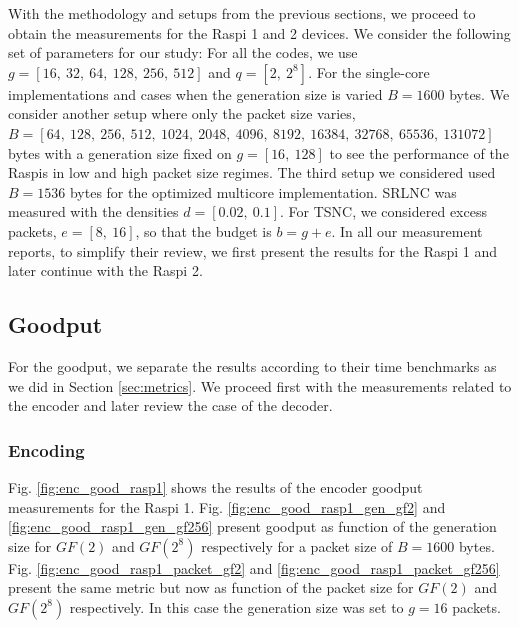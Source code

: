 \label{sec:measurements}

With the methodology and setups from the previous sections, we
proceed to obtain the measurements for the \ac{Raspi} 1 and 2 devices.
We consider the following set of parameters for our study:
For all the codes, we use $g = [16,\ 32,\ 64,\ 128,\ 256,\ 512]$
and $q = [2,\ 2^8]$. For the single-core implementations
and cases when the generation size is varied $B = 1600$ bytes.
We consider another setup where only the packet size varies,
$B = [64,\ 128,\ 256,\ 512,\ 1024,\ 2048,\ 4096,\ 8192,\ 16384,\ 32768
,\ 65536,\ 131072]$ bytes with a generation size fixed on $g = [16,\ 128]$
to see the performance of the \ac{Raspi}s in low and high
packet size regimes. The third setup we considered used $B = 1536$ bytes for the optimized
multicore implementation. 
\ac{SRLNC} was measured with the densities $d = [0.02,\ 0.1]$.
For \ac{TSNC}, we considered excess packets,
$e = [8,\ 16]$, so that the budget is $b = g + e$. In all our
measurement reports, to simplify their review, we first present the
results for the \ac{Raspi} 1 and later continue with the \ac{Raspi} 2.

\subsection{Goodput}
For the goodput, we separate the results according to their time benchmarks
as we did in Section \ref{sec:metrics}.
We proceed first with the measurements related to the encoder
and later review the case of the decoder.

\subsubsection{Encoding}
Fig. \ref{fig:enc_good_rasp1} shows the results of the encoder goodput
measurements for the \ac{Raspi} 1. Fig. \ref{fig:enc_good_rasp1_gen_gf2}
and \ref{fig:enc_good_rasp1_gen_gf256} present goodput as function of the
generation size for $GF(2)$ and $GF(2^8)$ respectively for a packet size
of $B = 1600$ bytes. Fig. \ref{fig:enc_good_rasp1_packet_gf2} and
\ref{fig:enc_good_rasp1_packet_gf256} present the same metric but now as
function of the packet size for $GF(2)$ and $GF(2^8)$ respectively. In this
case the generation size was set to $g = 16$ packets.

